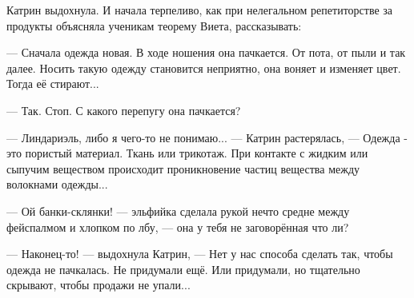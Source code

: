 Катрин выдохнула. И начала терпеливо, как при нелегальном репетиторстве за продукты объясняла ученикам теорему Виета,
 рассказывать:

--- Сначала одежда новая. В ходе ношения она пачкается. От пота, от пыли и так далее.
Носить такую одежду становится неприятно, она воняет и изменяет цвет. Тогда её стирают...

--- Так. Стоп. С какого перепугу она пачкается?

--- Линдариэль, либо я чего-то не понимаю... --- Катрин растерялась,
--- Одежда - это пористый материал. Ткань или трикотаж.
При контакте с жидким или сыпучим веществом происходит проникновение частиц вещества между волокнами одежды...

--- Ой банки-склянки! --- эльфийка сделала рукой нечто средне между фейспалмом и хлопком по лбу,
--- она у тебя не заговорённая что ли?

--- Наконец-то! --- выдохнула Катрин, --- Нет у нас способа сделать так, чтобы одежда не пачкалась.
Не придумали ещё. Или придумали, но тщательно скрывают, чтобы продажи не упали...


\emptypar

\emptypar
